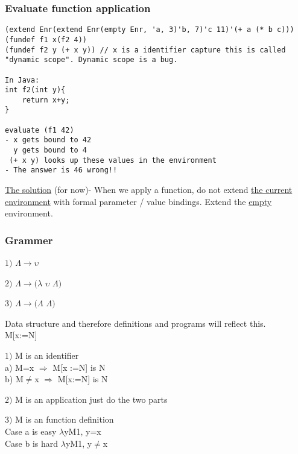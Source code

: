\documentclass{article}
\begin{document}
\subsubsection*{Evaluate function application}
\begin{verbatim}
(extend Enr(extend Enr(empty Enr, 'a, 3)'b, 7)'c 11)'(+ a (* b c)))
(fundef f1 x(f2 4))
(fundef f2 y (+ x y)) // x is a identifier capture this is called "dynamic scope". Dynamic scope is a bug.

In Java: 
int f2(int y){
	return x+y;
}

evaluate (f1 42) 
- x gets bound to 42
  y gets bound to 4
 (+ x y) looks up these values in the environment
- The answer is 46 wrong!!
\end{verbatim}

\begin{flushleft}
\underline{The solution} (for now)- When we apply a function, do not extend \underline{the current environment} with formal parameter / value bindings. Extend the \underline{empty} environment.
\end{flushleft}

\subsubsection*{Grammer}
\begin{flushleft}

$1)$ $\Lambda\rightarrow\upsilon$

$2)$ $\Lambda\rightarrow(\lambda$ 
$\upsilon$
$\Lambda)$

$3)$ $\Lambda\rightarrow(\Lambda$
$\Lambda)$

Data structure and therefore definitions and programs will reflect this.\\
M[x:=N]\\
\end{flushleft}

\begin{flushleft}
$1)$ M is an identifier\\
a) M=x $\Rightarrow$ M[x	:=N] is N\\
b) M$\neq$x $\Rightarrow$ M[x:=N] is N\\
\end{flushleft}

\begin{flushleft}
$2)$ M is an application just do the two parts\\
\end{flushleft}

\begin{flushleft}
$3)$ M is an function definition\\
Case a is easy $\lambda$yM1, y=x\\
Case b is hard $\lambda$yM1, y$\neq$x\\
\end{flushleft}
\end{document}
